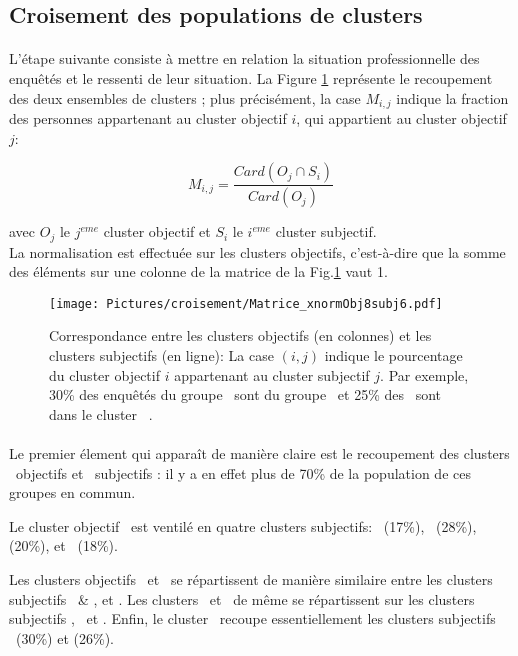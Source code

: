 \documentclass[11pt,fleqn,openany,frenchb]{book} %
\begin{document}
\subsection{Croisement des populations de clusters}
\paragraph{}
L'étape suivante consiste à mettre en relation la situation professionnelle des enquêtés et le ressenti de leur situation. La Figure \ref{fig:objxsubj} représente le recoupement des deux ensembles de clusters ; plus précisément, la case $M_{i,j}$ indique la fraction des personnes appartenant au cluster objectif $i$, qui appartient au cluster objectif $j$: 

$$M_{i,j} = \frac{Card(O_j \cap S_i)}{Card(O_j)}$$

avec $O_j$ le $j^{eme}$ cluster objectif et $S_i$ le $i^{eme}$ cluster subjectif. \\

La normalisation est effectuée sur les clusters objectifs, c'est-à-dire que la somme des éléments sur une colonne de la matrice de la Fig.\ref{fig:objxsubj} vaut 1.

\begin{figure}[!h]
\center
\texttt{[image: Pictures/croisement/Matrice\_xnormObj8subj6.pdf]}
\caption{Correspondance entre les clusters objectifs (en colonnes) et les clusters subjectifs (en ligne): La case $(i,j)$ indique le pourcentage du cluster objectif $i$ appartenant au cluster subjectif $j$. Par exemple, 30\% des enquêtés du groupe \ACC\ sont du groupe \MALH\, et 25\% des \ACC\ sont dans le cluster \ENV\ .}
\label{fig:objxsubj}
\end{figure} %
\paragraph{}
Le premier élement qui apparaît de manière claire est le recoupement des clusters \INDEP\ objectifs et \INDEP\ subjectifs : il y a en effet plus de 70\% de la population de ces groupes en commun. 

Le cluster objectif \SERV\ est ventilé en quatre clusters subjectifs: \INDEP\ (17\%), \HEUR\ (28\%), \RAS (20\%), et \ENV\ (18\%). 

Les clusters objectifs \OUVR\ et \IMM\ se répartissent de manière similaire entre les clusters subjectifs \HEUR\ \& \RAS, et \ENV. Les clusters \CSPPPr\ et \CSPPPu\ de même se  répartissent sur les clusters subjectifs \RAS, \GLOB\ et \ENV. Enfin, le cluster \ACC\  recoupe 
essentiellement les clusters subjectifs \MALH\ (30\%) et \ENV (26\%).
\end{document}
